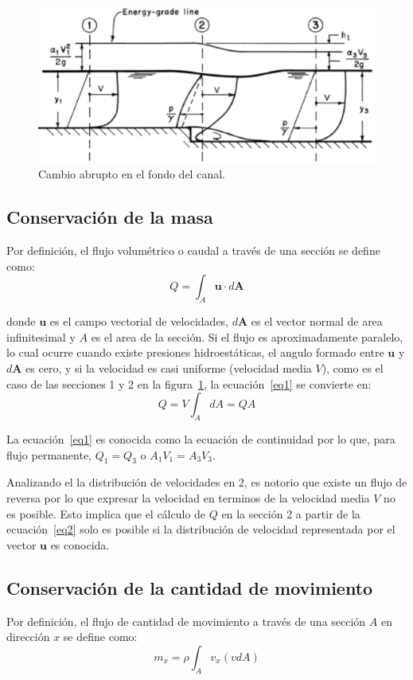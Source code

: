 \documentclass[11pt, oneside]{article}
\begin{document}
\begin{figure}[h]
    \centering
    \includegraphics[width=0.8\linewidth]{fig71.png}
    \caption{Cambio abrupto en el fondo del canal.}
    \label{fig71}
\end{figure}

\subsection{Conservaci\'on de la masa}
Por definici\'on, el flujo volum\'etrico o caudal a trav\'es de una secci\'on se define como:
\begin{equation}
    Q = \int_A \mathbf{u} \cdot d\mathbf{A}
\label{eq1}
\end{equation}

donde $\mathbf{u}$ es el campo vectorial de velocidades, $d\mathbf{A}$ es el vector normal de area infinitesimal y $A$ es el area de la secci\'on. Si el flujo es aproximadamente paralelo, lo cual ocurre cuando existe presiones hidroest\'aticas, el angulo formado entre $\mathbf{u}$ y $d\mathbf{A}$ es cero, y si la velocidad es casi uniforme (velocidad media $V$), como es el caso de las secciones 1 y 2 en la figura~\ref{fig71}, la ecuaci\'on~\ref{eq1} se convierte en:
\begin{equation}
    Q = V \int_A  dA = QA
\label{eq2}
\end{equation}

La ecuaci\'on~\ref{eq1} es conocida como la ecuaci\'on de continuidad por lo que, para flujo permanente, $Q_1 = Q_3$ o $A_1 V_1  = A_3 V_3$. 

Analizando el la distribuci\'on de velocidades en 2, es notorio que existe un flujo de reversa por lo que expresar la velocidad en terminos de la velocidad media $V$ no es posible. Esto implica que el c\'alculo de $Q$ en la secci\'on 2 a partir de la ecuaci\'on~\ref{eq2} solo es posible si la distribuci\'on de velocidad representada por el vector $\mathbf{u}$  es conocida. 


\subsection{Conservaci\'on de la cantidad de movimiento}
Por definici\'on, el flujo de cantidad de movimiento  a trav\'es de una secci\'on $A$ en direcci\'on $x$ se define como: 
\begin{equation}
    m_x = \rho \int_A v_x \left( v dA \right)
\label{eq3}
\end{equation}
\end{document}
